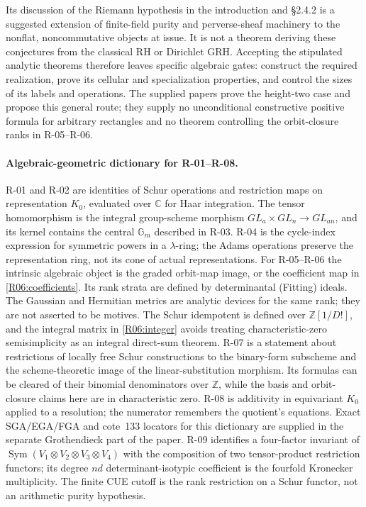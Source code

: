 Its discussion of the Riemann hypothesis in the introduction and
\S2.4.2 is a suggested extension of finite-field purity and
perverse-sheaf machinery to the nonflat, noncommutative objects at
issue. It is not a theorem deriving these conjectures from the
classical RH or Dirichlet GRH. Accepting the stipulated analytic
theorems therefore leaves specific algebraic gates: construct the
required realization, prove its cellular and specialization
properties, and control the sizes of its labels and operations.
The supplied papers prove the height-two case and propose this
general route; they supply no unconditional constructive positive
formula for arbitrary rectangles and no theorem controlling the
orbit-closure ranks in R-05--R-06.

\paragraph{Algebraic-geometric dictionary for R-01--R-08.}
R-01 and R-02 are identities of Schur operations and restriction maps
on representation $K_0$, evaluated over $\mathbb C$ for Haar integration.
The tensor homomorphism is the integral group-scheme morphism
$GL_a\times GL_n\to GL_{an}$, and its kernel contains the central
$\mathbb G_m$ described in R-03. R-04 is the cycle-index expression
for symmetric powers in a $\lambda$-ring; the Adams operations preserve
the representation ring, not its cone of actual representations.
For R-05--R-06 the intrinsic algebraic object is the graded orbit-map
image, or the coefficient map in \eqref{R06:coefficients}. Its rank
strata are defined by determinantal (Fitting) ideals. The Gaussian
and Hermitian metrics are analytic devices for the same rank; they
are not asserted to be motives. The Schur idempotent is defined over
$\mathbb Z[1/D!]$, and the integral matrix in \eqref{R06:integer}
avoids treating characteristic-zero semisimplicity as an integral
direct-sum theorem. R-07 is a statement about restrictions of locally
free Schur constructions to the binary-form subscheme and the
scheme-theoretic image of the linear-substitution morphism. Its
formulas can be cleared of their binomial denominators over
$\mathbb Z$, while the basis and orbit-closure claims here are in
characteristic zero. R-08 is additivity in equivariant $K_0$ applied
to a resolution; the numerator remembers the quotient's equations.
Exact SGA/EGA/FGA and cote~133 locators for this dictionary are supplied
in the separate Grothendieck part of the paper.
R-09 identifies a four-factor invariant of
$\operatorname{Sym}(V_1\otimes V_2\otimes V_3\otimes V_4)$ with the
composition of two tensor-product restriction functors; its degree
$nd$ determinant-isotypic coefficient is the fourfold Kronecker
multiplicity. The finite CUE cutoff is the rank restriction on a
Schur functor, not an arithmetic purity hypothesis.
